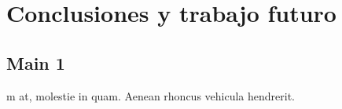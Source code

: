 
\chapter{Conclusiones y trabajo futuro} %

\label{ChapterX} %




\section{Main  1}

m at, molestie in quam. Aenean rhoncus vehicula hendrerit.